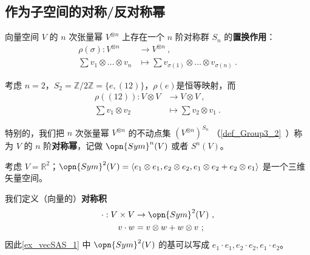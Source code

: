 
\begin{issues}
\issueTODO
{}
\end{issues}


\subsection{作为子空间的对称/反对称幂}

向量空间 $V$ 的 $n$ 次张量幂 $V^{\otimes n}$ 上存在一个 $n$ 阶对称群 $S_n$ 的\textbf{置换作用}：
\begin{equation}
\begin{aligned}
\rho(\sigma): V^{\otimes n} &\to V^{\otimes n}~, \\
\sum v_1 \otimes \dots \otimes v_n &\mapsto \sum v_{\sigma(1)} \otimes \dots \otimes v_{\sigma(n)}~.
\end{aligned}
\end{equation}

\begin{example}{}
考虑 $n = 2$，$S_2 = \mathbb{Z}/2\mathbb{Z} = \{e, (1 2)\}$，$\rho(e)$是恒等映射，而
\begin{equation}
\begin{aligned}
\rho((1 2)): V \otimes V &\to V \otimes V~, \\
\sum v_1 \otimes v_2 &\mapsto \sum v_2 \otimes v_1~.
\end{aligned}
\end{equation}
\end{example}

特别的，我们把 $n$ 次张量幂 $V^{\otimes n}$ 的不动点集 $(V^{\otimes n})^{S_n}$ （\autoref{def_Group3_2}~）称为 $V$ 的 $n$ 阶\textbf{对称幂}，记做 $\opn{Sym}^n(V)$ 或者 $S^n(V)$。

\begin{example}{}\label{ex_vecSAS_1}
考虑 $V = \mathbb{R}^2$；$\opn{Sym}^2(V) = \langle e_1 \otimes e_1, e_2 \otimes e_2, e_1 \otimes e_2 + e_2 \otimes e_1 \rangle$ 是一个三维矢量空间。
\end{example}

我们定义（向量的）\textbf{对称积}
\begin{equation}
\begin{aligned}
\cdot: V \times V &\to \opn{Sym}^2(V)~, \\
v \cdot w &= v \otimes w + w \otimes v~;
\end{aligned}
\end{equation}
因此\autoref{ex_vecSAS_1} 中 $\opn{Sym}^2(V)$ 的基可以写成 $e_1 \cdot e_1, e_2 \cdot e_2, e_1 \cdot e_2$。


